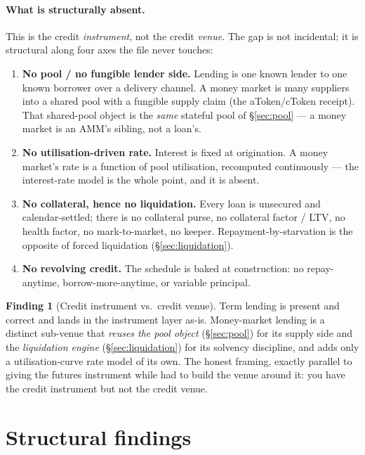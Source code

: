 \documentclass[11pt]{article}
\theoremstyle{definition}
\newtheorem{finding}{Finding}
\begin{document}
\paragraph{What is structurally absent.}
This is the credit \emph{instrument}, not the credit \emph{venue}. The gap is not incidental; it is
structural along four axes the file never touches:
\begin{enumerate}[label=\arabic*.,leftmargin=2em]
\item \textbf{No pool / no fungible lender side.} Lending is one known lender to one known borrower over
a delivery channel. A money market is many suppliers into a shared pool with a fungible supply claim
(the aToken/cToken receipt). That shared-pool object is the \emph{same} stateful pool of
\S\ref{sec:pool} --- a money market is an AMM's sibling, not a loan's.
\item \textbf{No utilisation-driven rate.} Interest is fixed at origination. A money market's rate is a
function of pool utilisation, recomputed continuously --- the interest-rate model is the whole point, and
it is absent.
\item \textbf{No collateral, hence no liquidation.} Every loan is unsecured and calendar-settled; there
is no collateral purse, no collateral factor / LTV, no health factor, no mark-to-market, no keeper.
Repayment-by-starvation is the opposite of forced liquidation (\S\ref{sec:liquidation}).
\item \textbf{No revolving credit.} The schedule is baked at construction: no repay-anytime,
borrow-more-anytime, or variable principal.
\end{enumerate}

\begin{finding}[Credit instrument vs.\ credit venue]\label{find:lending}
Term lending is present and correct and lands in the instrument layer as-is. Money-market lending is a
distinct sub-venue that \emph{reuses the pool object} (\S\ref{sec:pool}) for its supply side and the
\emph{liquidation engine} (\S\ref{sec:liquidation}) for its solvency discipline, and adds only a
utilisation-curve rate model of its own. The honest framing, exactly parallel to \cite{finrho} giving
the futures instrument while \cite{predmkt} had to build the venue around it: you have the credit
instrument but not the credit venue.
\end{finding}

\section{Structural findings}\label{sec:findings}
\end{document}
